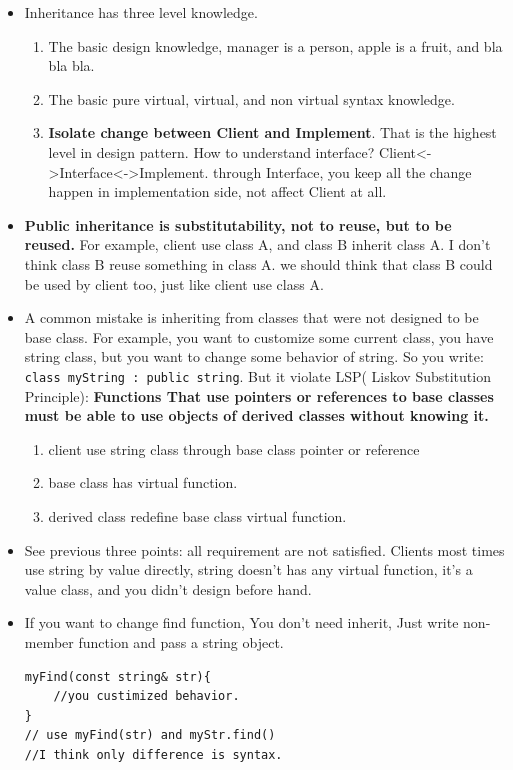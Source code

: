 \documentclass[a4paper,11pt,twoside]{book}
\begin{document}
\begin{itemize}
	\item Inheritance has three level knowledge.
	\begin{enumerate}
		\item The basic design knowledge, manager is a person, apple is a fruit, and bla bla bla.
		
		\item The basic  pure virtual, virtual, and non virtual syntax knowledge.
		
		\item \textbf{Isolate change between Client and Implement}. That is the highest level in design pattern. How to understand interface? Client<->Interface<->Implement. through Interface, you keep all the change happen in implementation side, not affect Client at all.
	\end{enumerate}
	
	\item \textbf{Public inheritance is substitutability, not to reuse, but to be reused. } For example, client use class A, and class B inherit class A.  I don't think class B reuse something in class A. we should think that class B could be used by client too, just like client use class A.
	
	\item  A common mistake is inheriting from classes that were not designed to be base class. For example, you want to customize some current class, you have string class, but you want to change some behavior of string. So you write: \texttt{class myString : public string}. But it violate LSP( Liskov Substitution Principle): \textbf{Functions That use pointers or references to base classes must be able to use objects of derived classes without knowing it. }
	\begin{enumerate}
		\item client use string class through base class pointer or reference
		\item base class has virtual function.
		\item derived class redefine base class virtual function.
	\end{enumerate}
	
	\item See previous three points: all requirement are not satisfied. Clients most times use string by value directly, string doesn't has any virtual function, it's a value class, and you didn't design before hand.
	
\item If you want to change find function, You don't need inherit,  Just write non-member function and pass a string object.
\begin{lstlisting}[numbers=none]
myFind(const string& str){
	//you custimized behavior.
}
// use myFind(str) and myStr.find()
//I think only difference is syntax.
\end{lstlisting}
	

\end{itemize}
\end{document}
